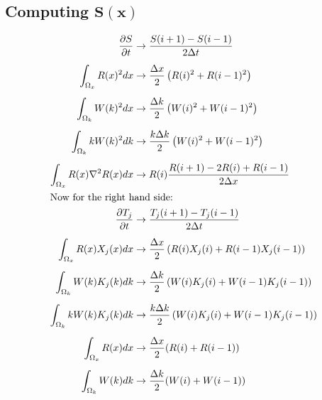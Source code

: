 \documentclass{article}
\def\ds{\displaystyle}
\def\pd{\partial}
\def\grad{\mathbf\nabla}
\begin{document}
\subsection{Computing $\mathbf{S(x)}$}
\begin{subequations}
\begin{align}
\frac{\pd S}{\pd t} &\to \frac{S(i+1) - S(i-1)}{2\Delta t} \\[5pt]
\ds\int_{\Omega_x} R(x)^2 dx &\to \frac{\Delta x}{2} \left( R(i)^2 + R(i-1)^2 \right) \\[5pt]
\ds\int_{\Omega_k} W(k)^2 dx &\to \frac{\Delta k}{2} \left( W(i)^2 + W(i-1)^2 \right) \\[5pt]
\ds\int_{\Omega_k} kW(k)^2 dk &\to \frac{k \Delta k}{2}\left( W(i)^2 + W(i-1)^2 \right) \\[5pt]
\ds\int_{\Omega_x} R(x)\grad^2 R(x) dx &\to R(i) \frac{R(i+1)-2R(i)+R(i-1)}{2\Delta x} \\
\intertext{Now for the right hand side:}
\frac{\pd T_j}{\pd t} &\to \frac{T_j(i+1)-T_j(i-1)}{2\Delta t} \\[5pt]
\ds\int_{\Omega_x} R(x) X_j(x) dx &\to \frac{\Delta x}{2} \left( R(i)X_j(i) + R(i-1)X_j(i-1) \right) \\[5pt]
\ds\int_{\Omega_k} W(k)K_j(k)dk &\to \frac{\Delta k}{2} \left( W(i)K_j(i) + W(i-1)K_j(i-1) \right) \\[5pt]
\ds\int_{\Omega_k} kW(k)K_j(k) dk &\to \frac{k\Delta k}{2} \left( W(i)K_j(i) + W(i-1)K_j(i-1) \right) \\[5pt]
\ds\int_{\Omega_x} R(x) dx &\to \frac{\Delta x}{2} (R(i) + R(i-1)) \\[5pt]
\ds\int_{\Omega_k} W(k) dk &\to \frac{\Delta k}{2} (W(i) + W(i-1))
\end{align}
\end{subequations}

%
\end{document}
